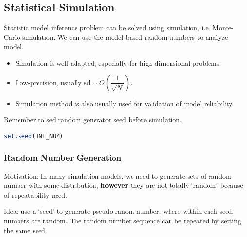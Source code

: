         
        
        

\subsection{Statistical Simulation} 
    Statistic model inference problem can be solved using simulation, i.e. Monte-Carlo simulation. We can use the model-based random numbers to analyze model.
\begin{itemize}[topsep=2pt,itemsep=0pt]
    \item Simulation is well-adapted, especially for high-dimensional problems
    \item Low-precision, usually $ \mathrm{sd} \sim O(\dfrac{1}{\sqrt{N}}) $. 
    \item Simulation method is also usually used for validation of model reliability.
\end{itemize}

\begin{rcode}
    Remember to sed random generator seed before simulation.
\begin{lstlisting}[language=R]
set.seed(INI_NUM)
\end{lstlisting}
\end{rcode}
    
\subsubsection{Random Number Generation}\label{SubSectionRandomNumberGeneration}
    Motivation: In many simulation models, we need to generate sets of random number with some distribution, \textbf{however} they are not totally `random' because of repeatability need. 

    Idea: use a `seed' to generate pseudo ranom number, where within each seed, numbers are random. The random number sequence can be repeated by setting the same seed.

